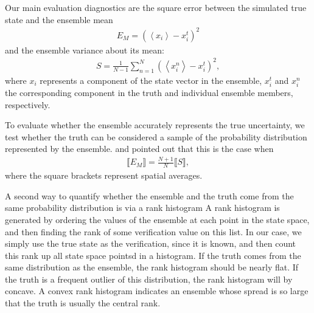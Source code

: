 Our main evaluation diagnostics are the square error between the simulated true state and the ensemble mean
\begin{eqnarray}
E_M = \left(
\left< x_i \right>-x_{i}^{t}
\right)^2
\end{eqnarray}
and the ensemble variance about its mean:
\begin{eqnarray}
S = 
\frac{1}{N-1}
\sum_{n=1}^N
\left(
	\left< x_{i}^{n} \right>-x_i^t
\right)^2,
\label{eq:spread}
\end{eqnarray}
where $x_{i}$ represents a component of the state vector in the ensemble,  $x_{i}^t$ and $x_{i}^n$ the corresponding component in the truth and individual ensemble members, respectively.

To evaluate whether the ensemble accurately represents the true uncertainty, we  test whether the truth can be considered a sample of the probability distribution represented by the ensemble.
 \citet{Huntley2009} and \citet{Murphy1988} pointed out that this is the case when 
\begin{eqnarray}
\llbracket E_M \rrbracket = \frac{N+1}{N} \llbracket S \rrbracket, 
\label{eq:EvsS}
\end{eqnarray}
where the square brackets represent spatial averages. 

A second way to quantify whether the ensemble and the truth come from the same probability distribution is via a rank histogram \citep[and references therein]{Hamill2001}
A rank histogram is generated by ordering the values of the ensemble at each point in the state space, and then finding the rank of some verification value on this list.
In our case, we simply use the true state as the verification, since it is known,
and then count this rank up all state space pointsd in a histogram. 
If the truth comes from the same distribution as the ensemble, the rank histogram should be nearly flat.  
If the truth is a frequent outlier of this distribution, the rank histogram will by concave.
A convex rank histogram indicates an ensemble whose spread is so large that the truth is usually the central rank. 

